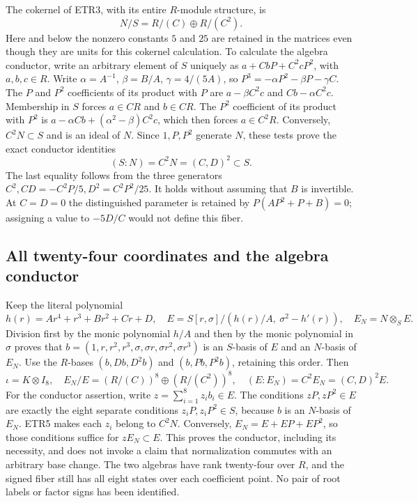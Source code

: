 The cokernel of ETR3, with its entire $R$-module structure, is
\[
 N/S=R/(C)\oplus R/(C^2).                                \tag{ETR4}
\]
Here and below the nonzero constants $5$ and $25$ are retained in the
matrices even though they are units for this cokernel calculation.
To calculate the algebra conductor, write an arbitrary element of $S$
uniquely as $a+CbP+C^2cP^2$, with $a,b,c\in R$. Write
$\alpha=A^{-1}$, $\beta=B/A$, $\gamma=4/(5A)$, so
$P^3=-\alpha P^2-\beta P-\gamma C$. The $P$ and $P^2$
coefficients of its product with $P$ are
$a-\beta C^2c$ and $Cb-\alpha C^2c$. Membership in $S$ forces
$a\in CR$ and $b\in CR$. The $P^2$ coefficient of its product with
$P^2$ is $a-\alpha Cb+(\alpha^2-\beta)C^2c$, which then forces
$a\in C^2R$. Conversely, $C^2N\subset S$ and is an ideal of $N$.
Since $1,P,P^2$ generate $N$, these tests prove the exact conductor
identities
\[
 (S:N)=C^2N=(C,D)^2\subset S.                            \tag{ETR5}
\]
The last equality follows from the three generators
$C^2,CD=-C^2P/5,D^2=C^2P^2/25$. It holds without assuming that
$B$ is invertible. At $C=D=0$ the distinguished parameter is retained
by $P(AP^2+P+B)=0$; assigning a value to $-5D/C$ would not define this
fiber.

\subsection{All twenty-four coordinates and the algebra conductor}
Keep the literal polynomial
\[
 h(r)=Ar^4+r^3+Br^2+Cr+D,\quad
 E=S[r,\sigma]/(h(r)/A,\ \sigma^2-h'(r)),\quad
 E_N=N\otimes_S E.                                     \tag{ETR6}
\]
Division first by the monic polynomial $h/A$ and then by the monic
polynomial in $\sigma$ proves that
$b=(1,r,r^2,r^3,\sigma,\sigma r,\sigma r^2,\sigma r^3)$ is an
$S$-basis of $E$ and an $N$-basis of $E_N$. Use the $R$-bases
$(b,Db,D^2b)$ and $(b,Pb,P^2b)$, retaining this order. Then
\[
 \iota=K\otimes I_8,
 \quad E_N/E=(R/(C))^8\oplus(R/(C^2))^8,
 \quad (E:E_N)=C^2E_N=(C,D)^2E.                         \tag{ETR7}
\]
For the conductor assertion, write $z=\sum_{i=1}^8z_i b_i\in E$.
The conditions $zP,zP^2\in E$ are exactly the eight separate conditions
$z_iP,z_iP^2\in S$, because $b$ is an $N$-basis of $E_N$. ETR5 makes
each $z_i$ belong to $C^2N$. Conversely, $E_N=E+EP+EP^2$, so those
conditions suffice for $zE_N\subset E$. This proves the conductor,
including its necessity, and does not invoke a claim that normalization
commutes with an arbitrary base change. The two algebras have rank
twenty-four over $R$, and the signed fiber still has all eight states
over each coefficient point. No pair of root labels or factor signs
has been identified.


